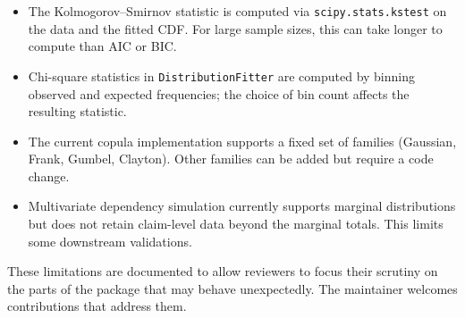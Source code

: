\begin{itemize}[leftmargin=*]
    \item The Kolmogorov--Smirnov statistic is computed via
          \texttt{scipy.stats.kstest} on the data and the fitted CDF.
          For large sample sizes, this can take longer to compute than
          AIC or BIC.
    \item Chi-square statistics in \texttt{DistributionFitter} are
          computed by binning observed and expected frequencies; the
          choice of bin count affects the resulting statistic.
    \item The current copula implementation supports a fixed set of
          families (Gaussian, Frank, Gumbel, Clayton). Other families
          can be added but require a code change.
    \item Multivariate dependency simulation currently supports
          marginal distributions but does not retain claim-level data
          beyond the marginal totals. This limits some downstream
          validations.
\end{itemize}

These limitations are documented to allow reviewers to focus their
scrutiny on the parts of the package that may behave unexpectedly. The
maintainer welcomes contributions that address them.
